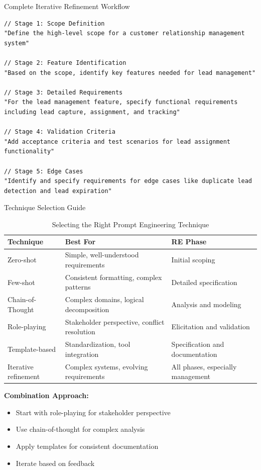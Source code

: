 \documentclass{beamer}
\begin{document}
\begin{frame}[fragile]{Complete Iterative Refinement Workflow}
    \begin{lstlisting}[style=code, caption={Multi-stage Refinement Process}]
// Stage 1: Scope Definition
"Define the high-level scope for a customer relationship management system"

// Stage 2: Feature Identification  
"Based on the scope, identify key features needed for lead management"

// Stage 3: Detailed Requirements
"For the lead management feature, specify functional requirements including lead capture, assignment, and tracking"

// Stage 4: Validation Criteria
"Add acceptance criteria and test scenarios for lead assignment functionality"

// Stage 5: Edge Cases
"Identify and specify requirements for edge cases like duplicate lead detection and lead expiration"
    \end{lstlisting}
\end{frame}

\begin{frame}{Technique Selection Guide}
    \begin{table}
        \scriptsize
        \centering
        \begin{tabular}{p{}|p{}|p{}}
            \textbf{Technique} & \textbf{Best For} & \textbf{RE Phase} \\
            \hline
            Zero-shot & Simple, well-understood requirements & Initial scoping \\
            Few-shot & Consistent formatting, complex patterns & Detailed specification \\
            Chain-of-Thought & Complex domains, logical decomposition & Analysis and modeling \\
            Role-playing & Stakeholder perspective, conflict resolution & Elicitation and validation \\
            Template-based & Standardization, tool integration & Specification and documentation \\
            Iterative refinement & Complex systems, evolving requirements & All phases, especially management \\
        \end{tabular}
        \caption{Selecting the Right Prompt Engineering Technique}
    \end{table}
    
    \textbf{Combination Approach:}
    \scriptsize
    \begin{itemize}
        \item Start with role-playing for stakeholder perspective
        \item Use chain-of-thought for complex analysis
        \item Apply templates for consistent documentation
        \item Iterate based on feedback
    \end{itemize}
\end{frame}
\end{document}

